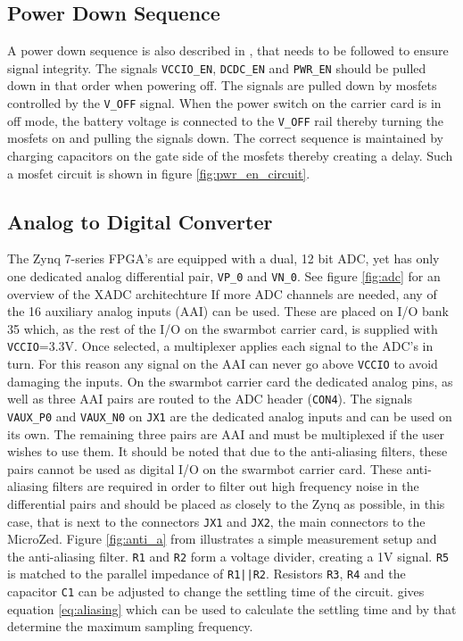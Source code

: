 \subsection{Power Down Sequence}
A power down sequence is also described in \cite{design_carrier}, that needs to be followed to ensure signal integrity. 
The signals \texttt{VCCIO\_EN}, \texttt{DCDC\_EN} and \texttt{PWR\_EN} should be pulled down in that order when powering off.
The signals are pulled down by mosfets controlled by the \texttt{V\_OFF} signal.
When the power switch on the carrier card is in off mode, the battery voltage is connected to the \texttt{V\_OFF} rail thereby turning the mosfets on and pulling the signals down. 
The correct sequence is maintained by charging capacitors on the gate side of the mosfets thereby creating a delay.
Such a mosfet circuit is shown in figure \ref{fig:pwr_en_circuit}.

\subsection{Analog to Digital Converter} %
\label{sub:analog_to_digital_converter}
The Zynq 7-series FPGA's are equipped with a dual, 12 bit ADC, yet has only one dedicated analog differential pair, \texttt{VP\_0} and \texttt{VN\_0}.
See figure \ref{fig:adc} for an overview of the XADC architechture
If more ADC channels are needed, any of the 16 auxiliary analog inputs (AAI) can be used.
These are placed on I/O bank 35 which, as the rest of the I/O on the swarmbot carrier card, is supplied with \texttt{VCCIO}=3.3V.
Once selected, a multiplexer applies each signal to the ADC's in turn.
For this reason any signal on the AAI can never go above \texttt{VCCIO} to avoid damaging the inputs.
On the swarmbot carrier card the dedicated analog pins, as well as three AAI pairs are routed to the ADC header (\texttt{CON4}).
The signals \texttt{VAUX\_P0} and \texttt{VAUX\_N0} on \texttt{JX1} are the dedicated analog inputs and can be used on its own.
The remaining three pairs are AAI and must be multiplexed if the user wishes to use them.
It should be noted that due to the anti-aliasing filters, these pairs cannot be used as digital I/O on the swarmbot carrier card.
These anti-aliasing filters are required in order to filter out high frequency noise in the differential pairs and should be placed as closely to the Zynq as possible, in this case, that is next to the connectors \texttt{JX1} and \texttt{JX2}, the main connectors to the MicroZed.
Figure \ref{fig:anti_a} from \cite{adch} illustrates a simple measurement setup and the anti-aliasing filter.
\texttt{R1} and \texttt{R2} form a voltage divider, creating a 1V signal.
\texttt{R5} is matched to the parallel impedance of \texttt{R1||R2}.
Resistors \texttt{R3}, \texttt{R4} and the capacitor \texttt{C1} can be adjusted to change the settling time of the circuit.
\cite{adc} gives equation \ref{eq:aliasing} which can be used to calculate the settling time and by that determine the maximum sampling frequency.

